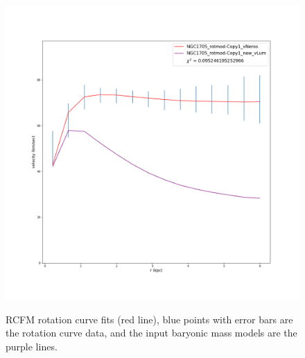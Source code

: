 \documentclass[reprint,%
 amsmath,amssymb,
 aps,
]{revtex4-1}
\begin{document}
\begin{figure}
\begin{minipage}{.5\textwidth}
  \label{fig:test2}
\end{minipage}
\begin{minipage}{.5\textwidth}
  \centering
  \includegraphics[width=.95\linewidth]{Updated_Graphs_withnewcolorsandfonts/NGC1705_rotmod-Copy1_XueSofue.png}
  \label{fig:test1}
\end{minipage}
 \caption{RCFM rotation curve fits (red line), blue points with error bars are the rotation curve data, and the input baryonic mass models are the purple lines.    }
\end{figure}
 
\end{document}
